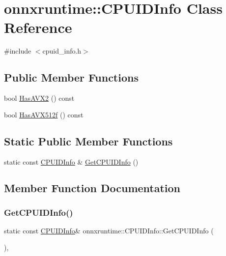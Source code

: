 \hypertarget{classonnxruntime_1_1CPUIDInfo}{}\section{onnxruntime\+:\+:C\+P\+U\+I\+D\+Info Class Reference}
\label{classonnxruntime_1_1CPUIDInfo}


{\ttfamily \#include $<$cpuid\+\_\+info.\+h$>$}

\subsection*{Public Member Functions}
\begin{DoxyCompactItemize}
\item 
bool \mbox{\hyperlink{classonnxruntime_1_1CPUIDInfo_a10143714e81d446422ebeea2cb9b8a0e}{Has\+A\+V\+X2}} () const
\item 
bool \mbox{\hyperlink{classonnxruntime_1_1CPUIDInfo_a3ef37390c7764244faa869260d21379a}{Has\+A\+V\+X512f}} () const
\end{DoxyCompactItemize}
\subsection*{Static Public Member Functions}
\begin{DoxyCompactItemize}
\item 
static const \mbox{\hyperlink{classonnxruntime_1_1CPUIDInfo}{C\+P\+U\+I\+D\+Info}} \& \mbox{\hyperlink{classonnxruntime_1_1CPUIDInfo_aadf726d51f8dc04cd3232a86522aef7e}{Get\+C\+P\+U\+I\+D\+Info}} ()
\end{DoxyCompactItemize}


\subsection{Member Function Documentation}
\mbox{\label{classonnxruntime_1_1CPUIDInfo_aadf726d51f8dc04cd3232a86522aef7e}} 
\subsubsection{\texorpdfstring{Get\+C\+P\+U\+I\+D\+Info()}{GetCPUIDInfo()}}
{\footnotesize\ttfamily static const \mbox{\hyperlink{classonnxruntime_1_1CPUIDInfo}{C\+P\+U\+I\+D\+Info}}\& onnxruntime\+::\+C\+P\+U\+I\+D\+Info\+::\+Get\+C\+P\+U\+I\+D\+Info (\begin{DoxyParamCaption}{ }\end{DoxyParamCaption})\hspace{0.3cm}{\ttfamily [inline]}, {\ttfamily [static]}}

